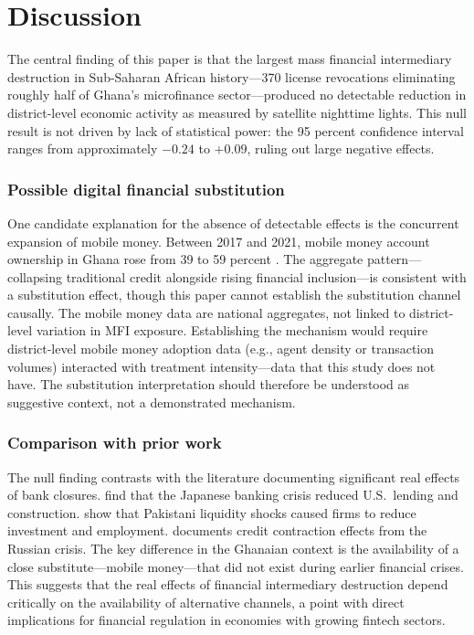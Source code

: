 \documentclass[12pt]{article}
\begin{document}
\section{Discussion}

The central finding of this paper is that the largest mass financial intermediary destruction in Sub-Saharan African history---370 license revocations eliminating roughly half of Ghana's microfinance sector---produced no detectable reduction in district-level economic activity as measured by satellite nighttime lights. This null result is not driven by lack of statistical power: the 95 percent confidence interval ranges from approximately $-0.24$ to $+0.09$, ruling out large negative effects.

\subsubsection*{Possible digital financial substitution} One candidate explanation for the absence of detectable effects is the concurrent expansion of mobile money. Between 2017 and 2021, mobile money account ownership in Ghana rose from 39 to 59 percent \citep{Demirguc2022}. The aggregate pattern---collapsing traditional credit alongside rising financial inclusion---is consistent with a substitution effect, though this paper cannot establish the substitution channel causally. The mobile money data are national aggregates, not linked to district-level variation in MFI exposure. Establishing the mechanism would require district-level mobile money adoption data (e.g., agent density or transaction volumes) interacted with treatment intensity---data that this study does not have. The substitution interpretation should therefore be understood as suggestive context, not a demonstrated mechanism.

\subsubsection*{Comparison with prior work} The null finding contrasts with the literature documenting significant real effects of bank closures. \citet{Peek2000} find that the Japanese banking crisis reduced U.S.\ lending and construction. \citet{Khwaja2008} show that Pakistani liquidity shocks caused firms to reduce investment and employment. \citet{Schnabl2012} documents credit contraction effects from the Russian crisis. The key difference in the Ghanaian context is the availability of a close substitute---mobile money---that did not exist during earlier financial crises. This suggests that the real effects of financial intermediary destruction depend critically on the availability of alternative channels, a point with direct implications for financial regulation in economies with growing fintech sectors.
\end{document}
